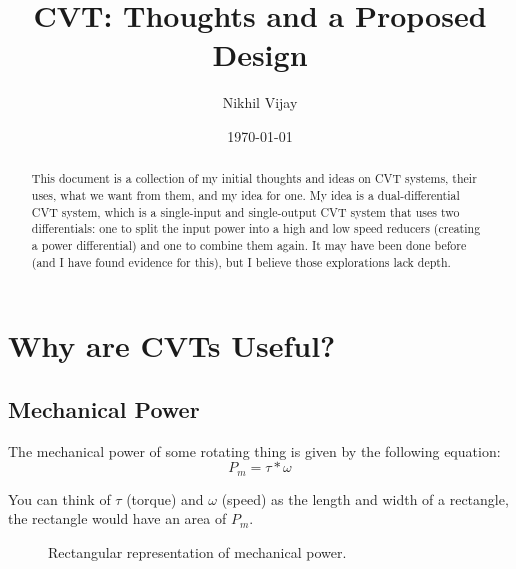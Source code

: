 \documentclass[12pt]{article}
\begin{document}
\title{CVT: Thoughts and a Proposed Design}
\author{Nikhil Vijay}
\date{\today}
\maketitle

\begin{abstract}
  This document is a collection of my initial thoughts and ideas on CVT systems, their uses, what we want from them, and my idea for one. My idea is a dual-differential CVT system, which is a single-input and single-output CVT system that uses two differentials: one to split the input power into a high and low speed reducers (creating a power differential) and one to combine them again. It may have been done before (and I have found evidence for this), but I believe those explorations lack depth.
\end{abstract}

\section{Why are CVTs Useful?}
\subsection{Mechanical Power}
The mechanical power of some rotating thing is given by the following equation:
\begin{equation}
  P_{m} = \tau*\omega
\end{equation}

You can think of $\tau$ (torque) and $\omega$ (speed) as the length and width of a rectangle, the rectangle would have an area of $P_{m}$. 

\begin{figure}[H]
  \centering
  \caption{Rectangular representation of mechanical power.}\label{fig:power_rectangle}
\end{figure}
\end{document}
